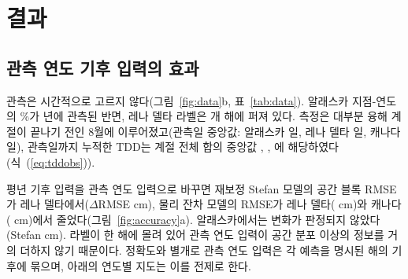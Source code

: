 \section{결과}\label{sec:results}

\subsection{관측 연도 기후 입력의 효과}
관측은 시간적으로 고르지 않다(그림~\ref{fig:data}b, 표~\ref{tab:data}). 알래스카 지점-연도의 \ntopyrshareAk\%가 \ntopyrAk{}년에 관측된 반면, 레나 델타 라벨은 \nnyrLe{}개 해에 퍼져 있다. 측정은 대부분 융해 계절이 끝나기 전인 8월에 이루어졌고(관측일 중앙값: 알래스카 \ndoymedAk{}일, 레나 델타 \ndoymedLe{}일, 캐나다 \ndoymedCa{}일), 관측일까지 누적한 TDD는 계절 전체 합의 중앙값 \ntddfracAk, \ntddfracLe, \ntddfracCa{}에 해당하였다(식~(\ref{eq:tddobs})).

평년 기후 입력을 관측 연도 입력으로 바꾸면 재보정 Stefan 모델의 공간 블록 RMSE가 레나 델타에서($\Delta$RMSE \ndforcLePo{} cm), 물리 잔차 모델의 RMSE가 레나 델타(\ndforcLeRo{} cm)와 캐나다(\ndforcCaRo{} cm)에서 줄었다(그림~\ref{fig:accuracy}a). 알래스카에서는 변화가 판정되지 않았다(Stefan \ndforcAkPo{} cm). 라벨이 한 해에 몰려 있어 관측 연도 입력이 공간 분포 이상의 정보를 거의 더하지 않기 때문이다. 정확도와 별개로 관측 연도 입력은 각 예측을 명시된 해의 기후에 묶으며, 아래의 연도별 지도는 이를 전제로 한다.


